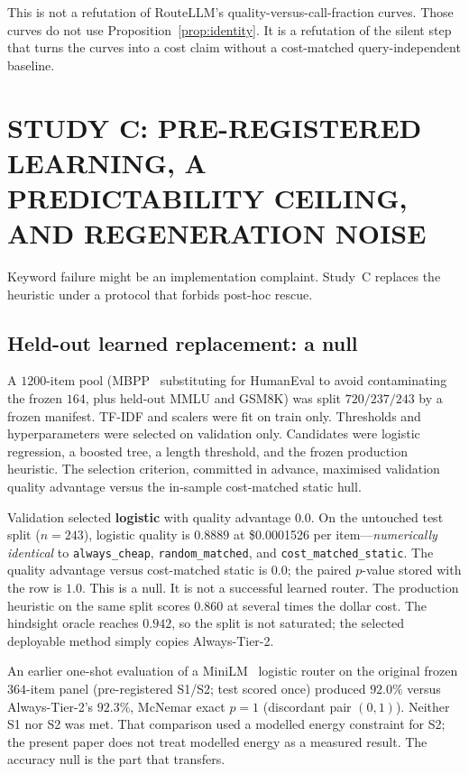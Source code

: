 \documentclass[a4paper,twoside]{article}
\begin{document}
This is not a refutation of RouteLLM's quality-versus-call-fraction curves. Those curves do not use Proposition~\ref{prop:identity}. It is a refutation of the silent step that turns the curves into a cost claim without a cost-matched query-independent baseline.

\section{\uppercase{Study C: Pre-registered Learning, a Predictability Ceiling, and Regeneration Noise}}
\label{sec:studyC}

Keyword failure might be an implementation complaint. Study~C replaces the heuristic under a protocol that forbids post-hoc rescue.

\subsection{Held-out learned replacement: a null}

A $1200$-item pool (MBPP~\cite{austin2021mbpp} substituting for HumanEval to avoid contaminating the frozen $164$, plus held-out MMLU and GSM8K) was split $720/237/243$ by a frozen manifest. TF-IDF and scalers were fit on train only. Thresholds and hyperparameters were selected on validation only. Candidates were logistic regression, a boosted tree, a length threshold, and the frozen production heuristic. The selection criterion, committed in advance, maximised validation quality advantage versus the in-sample cost-matched static hull.

Validation selected \textbf{logistic} with quality advantage $0.0$. On the untouched test split ($n=243$), logistic quality is $0.8889$ at \$0.0001526 per item---\emph{numerically identical} to \texttt{always\_cheap}, \texttt{random\_matched}, and \texttt{cost\_matched\_static}. The quality advantage versus cost-matched static is $0.0$; the paired $p$-value stored with the row is $1.0$. This is a null. It is not a successful learned router. The production heuristic on the same split scores $0.860$ at several times the dollar cost. The hindsight oracle reaches $0.942$, so the split is not saturated; the selected deployable method simply copies Always-Tier-2.

An earlier one-shot evaluation of a MiniLM~\cite{wang2020minilm,reimers2019minilm} logistic router on the original frozen $364$-item panel (pre-registered S1/S2; test scored once) produced $92.0\%$ versus Always-Tier-2's $92.3\%$, McNemar exact $p=1$ (discordant pair $(0,1)$). Neither S1 nor S2 was met. That comparison used a modelled energy constraint for S2; the present paper does not treat modelled energy as a measured result. The accuracy null is the part that transfers.
\end{document}
